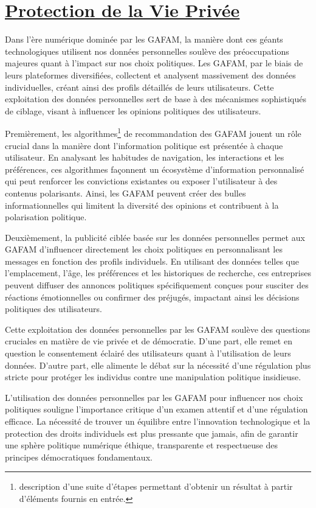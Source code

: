\documentclass[12pt,a4paper]{article} %
\begin{document}
	
	\section{\underline{Protection de la Vie Privée}}
	
	Dans l'ère numérique dominée par les GAFAM, la manière dont ces géants technologiques utilisent nos données personnelles soulève des préoccupations majeures quant à l'impact sur nos choix politiques. Les GAFAM, par le biais de leurs plateformes diversifiées, collectent et analysent massivement des données individuelles, créant ainsi des profils détaillés de leurs utilisateurs. Cette exploitation des données personnelles sert de base à des mécanismes sophistiqués de ciblage, visant à influencer les opinions politiques des utilisateurs.
	
	Premièrement, les algorithmes\footnote[8]{description d'une suite d'étapes permettant d'obtenir un résultat à partir d'éléments fournis en entrée.} de recommandation des GAFAM jouent un rôle crucial dans la manière dont l'information politique est présentée à chaque utilisateur. En analysant les habitudes de navigation, les interactions et les préférences, ces algorithmes façonnent un écosystème d'information personnalisé qui peut renforcer les convictions existantes ou exposer l'utilisateur à des contenus polarisants. Ainsi, les GAFAM peuvent créer des bulles informationnelles qui limitent la diversité des opinions et contribuent à la polarisation politique.
	
	Deuxièmement, la publicité ciblée basée sur les données personnelles permet aux GAFAM d'influencer directement les choix politiques en personnalisant les messages en fonction des profils individuels. En utilisant des données telles que l'emplacement, l'âge, les préférences et les historiques de recherche, ces entreprises peuvent diffuser des annonces politiques spécifiquement conçues pour susciter des réactions émotionnelles ou confirmer des préjugés, impactant ainsi les décisions politiques des utilisateurs.
	
	Cette exploitation des données personnelles par les GAFAM soulève des questions cruciales en matière de vie privée et de démocratie. D'une part, elle remet en question le consentement éclairé des utilisateurs quant à l'utilisation de leurs données. D'autre part, elle alimente le débat sur la nécessité d'une régulation plus stricte pour protéger les individus contre une manipulation politique insidieuse.
	
	L'utilisation des données personnelles par les GAFAM pour influencer nos choix politiques souligne l'importance critique d'un examen attentif et d'une régulation efficace. La nécessité de trouver un équilibre entre l'innovation technologique et la protection des droits individuels est plus pressante que jamais, afin de garantir une sphère politique numérique éthique, transparente et respectueuse des principes démocratiques fondamentaux.
	
\end{document}
